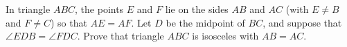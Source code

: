 In triangle $ABC$, the points $E$ and $F$ lie on the sides $AB$ and $AC$ (with $E\ne B$ and $F\ne C$) so that $AE=AF$. Let $D$ be the midpoint of $BC$, and suppose that $\angle EDB=\angle FDC$. Prove that triangle $ABC$ is isosceles with $AB=AC$.
